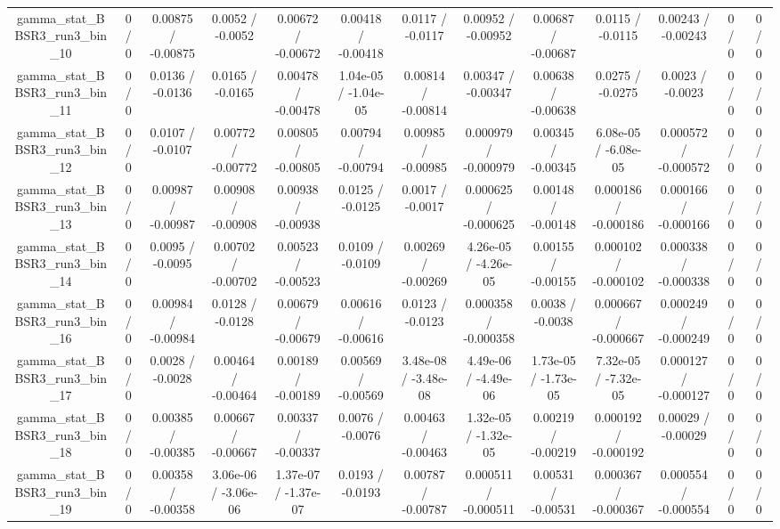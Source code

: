 \documentclass[10pt]{article}
\begin{document}
\begin{table}[htbp]
\begin{center}
\begin{tabular}{|c|c|c|c|c|c|c|c|c|c|c|c|c|}
  gamma_stat_BBSR3_run3_bin_10 & 0 / 0 & 0.00875 / -0.00875 & 0.0052 / -0.0052 & 0.00672 / -0.00672 & 0.00418 / -0.00418 & 0.0117 / -0.0117 & 0.00952 / -0.00952 & 0.00687 / -0.00687 & 0.0115 / -0.0115 & 0.00243 / -0.00243 & 0 / 0 & 0 / 0 \\ 
  gamma_stat_BBSR3_run3_bin_11 & 0 / 0 & 0.0136 / -0.0136 & 0.0165 / -0.0165 & 0.00478 / -0.00478 & 1.04e-05 / -1.04e-05 & 0.00814 / -0.00814 & 0.00347 / -0.00347 & 0.00638 / -0.00638 & 0.0275 / -0.0275 & 0.0023 / -0.0023 & 0 / 0 & 0 / 0 \\ 
  gamma_stat_BBSR3_run3_bin_12 & 0 / 0 & 0.0107 / -0.0107 & 0.00772 / -0.00772 & 0.00805 / -0.00805 & 0.00794 / -0.00794 & 0.00985 / -0.00985 & 0.000979 / -0.000979 & 0.00345 / -0.00345 & 6.08e-05 / -6.08e-05 & 0.000572 / -0.000572 & 0 / 0 & 0 / 0 \\ 
  gamma_stat_BBSR3_run3_bin_13 & 0 / 0 & 0.00987 / -0.00987 & 0.00908 / -0.00908 & 0.00938 / -0.00938 & 0.0125 / -0.0125 & 0.0017 / -0.0017 & 0.000625 / -0.000625 & 0.00148 / -0.00148 & 0.000186 / -0.000186 & 0.000166 / -0.000166 & 0 / 0 & 0 / 0 \\ 
  gamma_stat_BBSR3_run3_bin_14 & 0 / 0 & 0.0095 / -0.0095 & 0.00702 / -0.00702 & 0.00523 / -0.00523 & 0.0109 / -0.0109 & 0.00269 / -0.00269 & 4.26e-05 / -4.26e-05 & 0.00155 / -0.00155 & 0.000102 / -0.000102 & 0.000338 / -0.000338 & 0 / 0 & 0 / 0 \\ 
  gamma_stat_BBSR3_run3_bin_16 & 0 / 0 & 0.00984 / -0.00984 & 0.0128 / -0.0128 & 0.00679 / -0.00679 & 0.00616 / -0.00616 & 0.0123 / -0.0123 & 0.000358 / -0.000358 & 0.0038 / -0.0038 & 0.000667 / -0.000667 & 0.000249 / -0.000249 & 0 / 0 & 0 / 0 \\ 
  gamma_stat_BBSR3_run3_bin_17 & 0 / 0 & 0.0028 / -0.0028 & 0.00464 / -0.00464 & 0.00189 / -0.00189 & 0.00569 / -0.00569 & 3.48e-08 / -3.48e-08 & 4.49e-06 / -4.49e-06 & 1.73e-05 / -1.73e-05 & 7.32e-05 / -7.32e-05 & 0.000127 / -0.000127 & 0 / 0 & 0 / 0 \\ 
  gamma_stat_BBSR3_run3_bin_18 & 0 / 0 & 0.00385 / -0.00385 & 0.00667 / -0.00667 & 0.00337 / -0.00337 & 0.0076 / -0.0076 & 0.00463 / -0.00463 & 1.32e-05 / -1.32e-05 & 0.00219 / -0.00219 & 0.000192 / -0.000192 & 0.00029 / -0.00029 & 0 / 0 & 0 / 0 \\ 
  gamma_stat_BBSR3_run3_bin_19 & 0 / 0 & 0.00358 / -0.00358 & 3.06e-06 / -3.06e-06 & 1.37e-07 / -1.37e-07 & 0.0193 / -0.0193 & 0.00787 / -0.00787 & 0.000511 / -0.000511 & 0.00531 / -0.00531 & 0.000367 / -0.000367 & 0.000554 / -0.000554 & 0 / 0 & 0 / 0 \\ 

\end{tabular}
\end{center}
\end{table}
\end{document}
